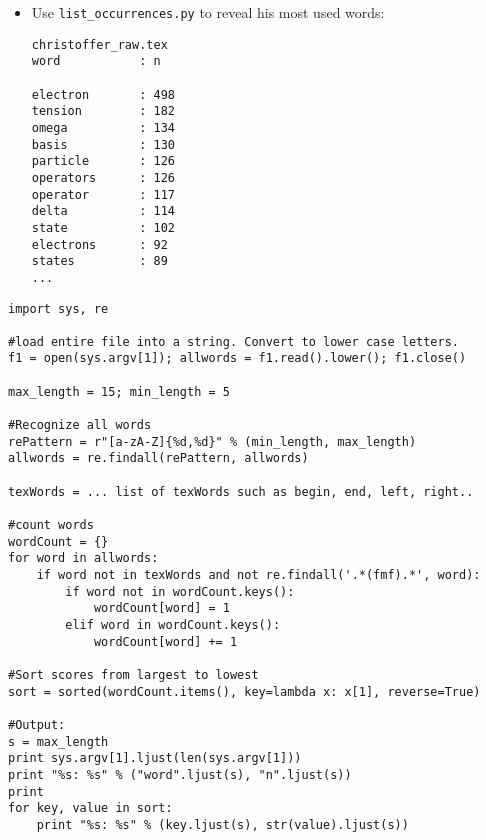 \documentclass{beamer}
\begin{document}
\begin{frame}[containsverbatim]
\begin{itemize}

\item Use \verb+list_occurrences.py+ to reveal his most used words:
 
\vspace{0.2cm}
\scriptsize
\begin{verbatim}
christoffer_raw.tex           
word           : n              

electron       : 498            
tension        : 182            
omega          : 134            
basis          : 130            
particle       : 126            
operators      : 126            
operator       : 117            
delta          : 114            
state          : 102            
electrons      : 92             
states         : 89    
...
\end{verbatim}
\normalsize
\end{itemize}
\end{frame}

\begin{frame}[containsverbatim]
\tiny
\begin{verbatim}
import sys, re

#load entire file into a string. Convert to lower case letters.
f1 = open(sys.argv[1]); allwords = f1.read().lower(); f1.close()

max_length = 15; min_length = 5

#Recognize all words
rePattern = r"[a-zA-Z]{%d,%d}" % (min_length, max_length)
allwords = re.findall(rePattern, allwords)

texWords = ... list of texWords such as begin, end, left, right..

#count words
wordCount = {}
for word in allwords:
    if word not in texWords and not re.findall('.*(fmf).*', word):
        if word not in wordCount.keys():
            wordCount[word] = 1
        elif word in wordCount.keys():
            wordCount[word] += 1

#Sort scores from largest to lowest
sort = sorted(wordCount.items(), key=lambda x: x[1], reverse=True)

#Output:
s = max_length
print sys.argv[1].ljust(len(sys.argv[1]))
print "%s: %s" % ("word".ljust(s), "n".ljust(s))     
print
for key, value in sort:
    print "%s: %s" % (key.ljust(s), str(value).ljust(s))
\end{verbatim}
\normalsize
\end{frame}
\end{document}
